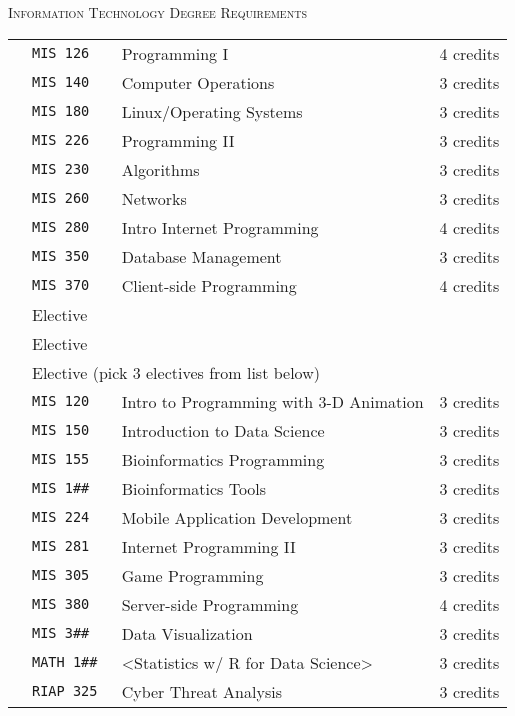 \documentclass[letterpaper,10pt]{article}
\newcounter{cseNum}
\newcommand\csenumber{\stepcounter{cseNum}\arabic{cseNum}}
\begin{document}
\newpage

\vspace{20pt}
{\scshape \Large Information Technology Degree Requirements}\\


\begin{tabular}{l l l l }
  \csenumber & \texttt{MIS 126} & Programming I & 4 credits \\[2pt]
  \csenumber & \texttt{MIS 140} & Computer Operations  & 3 credits \\[2pt]
  \csenumber & \texttt{MIS 180} & Linux/Operating Systems  & 3 credits \\[2pt]
  \csenumber & \texttt{MIS 226} & Programming II  & 3 credits \\[2pt]
  \csenumber & \texttt{MIS 230} & Algorithms & 3 credits \\[2pt]
  \csenumber & \texttt{MIS 260} & Networks & 3 credits \\[2pt]
  \csenumber & \texttt{MIS 280} & Intro Internet Programming  & 4 credits \\[2pt]
  \csenumber & \texttt{MIS 350} & Database Management & 3 credits \\[2pt]
  \csenumber & \texttt{MIS 370} & Client-side Programming & 4 credits \\[2pt]
  \csenumber & \multicolumn{2}{l}{ Elective } &  \\[2pt]
  \csenumber &  \multicolumn{2}{l}{ Elective } &  \\[2pt]
  \csenumber & \multicolumn{3}{l}{Elective \hspace{2em} (pick 3 electives from list below)}\\[2pt]  
     & \texttt{MIS 120} & Intro to Programming with 3-D Animation &  3 credits \\[2pt]
     & \texttt{MIS 150} & Introduction to Data Science &  3 credits \\[2pt]
     & \texttt{MIS 155} & Bioinformatics Programming &  3 credits \\[2pt]
     & \texttt{MIS 1\#\#} & Bioinformatics Tools  &  3 credits \\[2pt]
     & \texttt{MIS 224} & Mobile Application Development &  3 credits \\[2pt]
     & \texttt{MIS 281} & Internet Programming II &  3 credits \\[2pt]
     & \texttt{MIS 305} & Game Programming &  3 credits \\[2pt]
     & \texttt{MIS 380} & Server-side Programming &  4 credits \\[2pt]
     & \texttt{MIS 3\#\#} & Data Visualization &  3 credits \\[2pt]
     & \texttt{MATH 1\#\#} & <Statistics w/ R for Data Science> &  3 credits \\[2pt]
     & \texttt{RIAP 325 } & Cyber Threat Analysis &  3 credits \\
\end{tabular}
\end{document}
